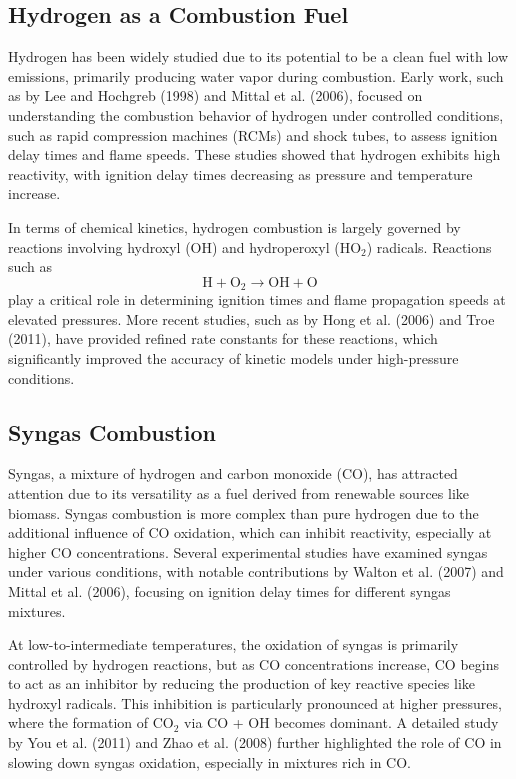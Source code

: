 \documentclass[12pt]{report}
\begin{document}
\subsection{Hydrogen as a Combustion Fuel}
Hydrogen has been widely studied due to its potential to be a clean fuel with low emissions, primarily producing water vapor during combustion. Early work, such as by Lee and Hochgreb (1998) and Mittal et al. (2006), focused on understanding the combustion behavior of hydrogen under controlled conditions, such as rapid compression machines (RCMs) and shock tubes, to assess ignition delay times and flame speeds. These studies showed that hydrogen exhibits high reactivity, with ignition delay times decreasing as pressure and temperature increase.

In terms of chemical kinetics, hydrogen combustion is largely governed by reactions involving hydroxyl (OH) and hydroperoxyl (HO$_2$) radicals. Reactions such as 
\begin{equation}
\text{H} + \text{O}_2 \rightarrow \text{OH} + \text{O}
\end{equation}
play a critical role in determining ignition times and flame propagation speeds at elevated pressures. More recent studies, such as by Hong et al. (2006) and Troe (2011), have provided refined rate constants for these reactions, which significantly improved the accuracy of kinetic models under high-pressure conditions.

\subsection{Syngas Combustion}
Syngas, a mixture of hydrogen and carbon monoxide (CO), has attracted attention due to its versatility as a fuel derived from renewable sources like biomass. Syngas combustion is more complex than pure hydrogen due to the additional influence of CO oxidation, which can inhibit reactivity, especially at higher CO concentrations. Several experimental studies have examined syngas under various conditions, with notable contributions by Walton et al. (2007) and Mittal et al. (2006), focusing on ignition delay times for different syngas mixtures.

At low-to-intermediate temperatures, the oxidation of syngas is primarily controlled by hydrogen reactions, but as CO concentrations increase, CO begins to act as an inhibitor by reducing the production of key reactive species like hydroxyl radicals. This inhibition is particularly pronounced at higher pressures, where the formation of CO$_2$ via CO + OH becomes dominant. A detailed study by You et al. (2011) and Zhao et al. (2008) further highlighted the role of CO in slowing down syngas oxidation, especially in mixtures rich in CO.
\end{document}
